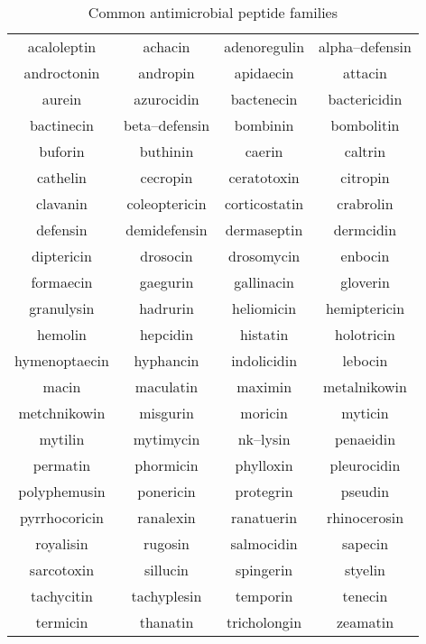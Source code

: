 
\begin{table}[!hbtp]
\centering
\caption{Common antimicrobial peptide families}\label{table:antimicrobialnames}
\begin{tabular}{cccc} \hline \hline
\small acaloleptin & 
\small achacin & 
\small adenoregulin & 
\small alpha--defensin \\ 
\small androctonin &
\small andropin & 
\small apidaecin & 
\small attacin \\
\small aurein & 
\small azurocidin & 
\small bactenecin & 
\small bactericidin \\ 
\small bactinecin & 
\small beta--defensin & 
\small bombinin & 
\small bombolitin \\
\small buforin & 
\small buthinin & 
\small caerin & 
\small caltrin \\
\small cathelin & 
\small cecropin & 
\small ceratotoxin & 
\small citropin \\ 
\small clavanin & 
\small coleoptericin & 
\small corticostatin & 
\small crabrolin \\ 
\small defensin & 
\small demidefensin & 
\small dermaseptin & 
\small dermcidin \\
\small diptericin & 
\small drosocin & 
\small drosomycin & 
\small enbocin \\
\small formaecin & 
\small gaegurin & 
\small gallinacin & 
\small gloverin \\ 
\small granulysin & 
\small hadrurin & 
\small heliomicin & 
\small hemiptericin \\ 
\small hemolin & 
\small hepcidin & 
\small histatin & 
\small holotricin \\
\small hymenoptaecin & 
\small hyphancin &
\small indolicidin & 
\small lebocin \\
\small macin & 
\small maculatin & 
\small maximin & 
\small metalnikowin \\ 
\small metchnikowin & 
\small misgurin & 
\small moricin & 
\small myticin \\
\small mytilin & 
\small mytimycin & 
\small nk--lysin & 
\small penaeidin \\ 
\small permatin & 
\small phormicin & 
\small phylloxin &
\small pleurocidin \\ 
\small polyphemusin & 
\small ponericin & 
\small protegrin & 
\small pseudin \\
\small pyrrhocoricin & 
\small ranalexin & 
\small ranatuerin & 
\small rhinocerosin \\ 
\small royalisin & 
\small rugosin & 
\small salmocidin & 
\small sapecin \\
\small sarcotoxin & 
\small sillucin & 
\small spingerin & 
\small styelin \\
\small tachycitin & 
\small tachyplesin & 
\small temporin & 
\small tenecin \\
\small termicin & 
\small thanatin & 
\small tricholongin & 
\small zeamatin \\ \hline \hline
\end{tabular}
\end{table}
